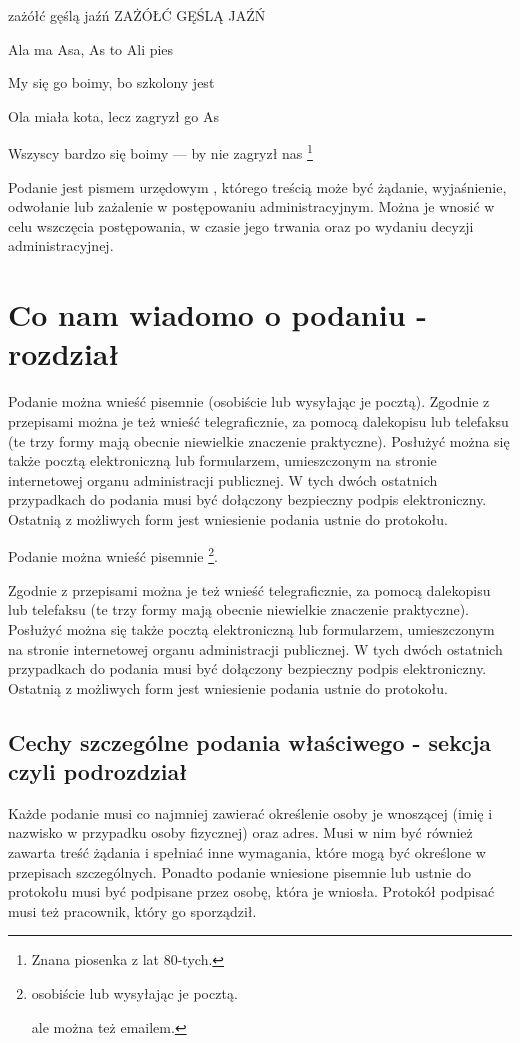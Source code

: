 zażółć gęślą jaźń ZAŻÓŁĆ GĘŚLĄ JAŹŃ

Ala ma Asa, As to Ali pies

My się go boimy, bo szkolony jest

Ola miała kota, lecz zagryzł go As

Wszyscy bardzo się boimy --- by nie zagryzł nas \footnote{Znana piosenka
  z lat 80-tych.}

Podanie jest pismem urzędowym , którego treścią może być żądanie,
wyjaśnienie, odwołanie lub zażalenie w postępowaniu administracyjnym.
Można je wnosić w celu wszczęcia postępowania, w czasie jego trwania
oraz po wydaniu decyzji administracyjnej.

\section{Co nam wiadomo o podaniu - rozdział}

Podanie można wnieść pisemnie (osobiście lub wysyłając je pocztą).
Zgodnie z przepisami można je też wnieść telegraficznie, za pomocą
dalekopisu lub telefaksu (te trzy formy mają obecnie niewielkie
znaczenie praktyczne). Posłużyć można się także pocztą elektroniczną lub
formularzem, umieszczonym na stronie internetowej organu administracji
publicznej. W tych dwóch ostatnich przypadkach do podania musi być
dołączony bezpieczny podpis elektroniczny. Ostatnią z możliwych form
jest wniesienie podania ustnie do protokołu.

Podanie można wnieść pisemnie \footnote{osobiście lub wysyłając je
  pocztą.

  ale można też emailem.}.

Zgodnie z przepisami można je też wnieść telegraficznie, za pomocą
dalekopisu lub telefaksu (te trzy formy mają obecnie niewielkie
znaczenie praktyczne). Posłużyć można się także pocztą elektroniczną lub
formularzem, umieszczonym na stronie internetowej organu administracji
publicznej. W tych dwóch ostatnich przypadkach do podania musi być
dołączony bezpieczny podpis elektroniczny. Ostatnią z możliwych form
jest wniesienie podania ustnie do protokołu.

\subsection{Cechy szczególne podania właściwego - sekcja czyli
podrozdział}

Każde podanie musi co najmniej zawierać określenie osoby je wnoszącej
(imię i nazwisko w przypadku osoby fizycznej) oraz adres. Musi w nim być
również zawarta treść żądania i spełniać inne wymagania, które mogą być
określone w przepisach szczególnych. Ponadto podanie wniesione pisemnie
lub ustnie do protokołu musi być podpisane przez osobę, która je
wniosła. Protokół podpisać musi też pracownik, który go sporządził.

